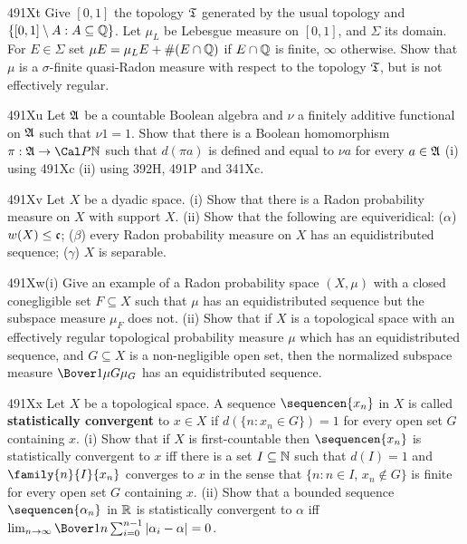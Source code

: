 {\spheader 491Xt Give $[0,1]$ the topology $\frak T$ generated by the
usual topology and $\{[0,1]\setminus A:A\subseteq\Bbb Q\}$.   Let
$\mu_L$ be Lebesgue measure on $[0,1]$,
and $\Sigma$ its domain.   For $E\in\Sigma$ set
$\mu E=\mu_LE+\#(E\cap\Bbb Q)$ if $E\cap\Bbb Q$ is finite, $\infty$
otherwise.   Show that $\mu$ is a $\sigma$-finite
quasi-Radon measure with respect to the topology $\frak T$, but is not
effectively regular.

\spheader 491Xu
Let $\frak A$ be a countable Boolean algebra and $\nu$ a
finitely additive functional on $\frak A$ such that $\nu 1=1$.   Show
that there is a Boolean
homomorphism $\pi:\frak A\to\Cal P\Bbb N$ such that $d(\pi a)$ is
defined and equal to $\nu a$ for every $a\in\frak A$ (i) using 491Xc
(ii) using 392H, 491P and 341Xc.

\spheader 491Xv Let $X$ be a dyadic space.   (i) Show that there is a
Radon probability measure on $X$ with support $X$.
(ii) Show that the following are equiveridical:  ($\alpha$)
$w(X)\le\frak c$;  ($\beta$) every Radon probability measure on $X$ has an
equidistributed sequence;  ($\gamma$) $X$ is separable.

\spheader 491Xw(i) Give an example of a Radon probability space
$(X,\mu)$ with a closed conegligible set $F\subseteq X$ such that
$\mu$ has an equidistributed sequence but the subspace measure
$\mu_F$ does not.      (ii) Show that
if $X$ is a topological space with an effectively regular topological
probability measure $\mu$ which has an equidistributed sequence, and
$G\subseteq X$ is a non-negligible open set, then the normalized subspace
measure
$\Bover1{\mu G}\mu_G$ has an equidistributed sequence.   


\spheader 491Xx Let $X$ be a topological space.   A sequence
$\sequencen{x_n}$ in $X$
is called {\bf statistically convergent} to $x\in X$ if
$d(\{n:x_n\in G\})=1$ for every open set $G$ containing $x$.
(i) Show that if
$X$ is first-countable then $\sequencen{x_n}$ is statistically convergent
to $x$ iff there is a set $I\subseteq\Bbb N$ such that $d(I)=1$ and
$\family{n}{I}{x_n}$ converges to $x$ in the sense that
$\{n:n\in I$, $x_n\notin G\}$ is finite for every open set $G$ containing
$x$.  (ii) Show that a bounded sequence $\sequencen{\alpha_n}$ in $\Bbb R$
is statistically convergent to $\alpha$ iff
$\lim_{n\to\infty}\Bover1n\sum_{i=0}^{n-1}|\alpha_i-\alpha|=0$.

}
